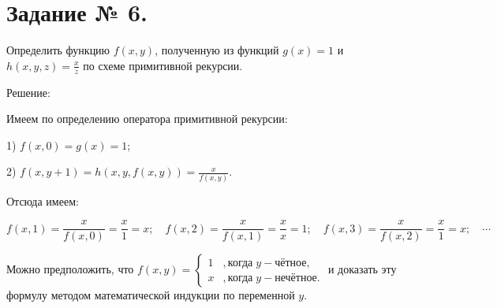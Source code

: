 \documentclass[fleqn]{article}
\begin{document}
\medskip
{}
\medskip

\section*{Задание № 6.}

Определить функцию $f(x,y)$, полученную из функций $g(x) =1$ и
$h(x, y, z) = \frac{x}{z}$ по схеме примитивной рекурсии.

\begin{center}Решение:\end{center}

Имеем по определению оператора примитивной рекурсии:

1) $f(x,0)=g(x)=1$;

2) $f(x,y+1)=h\left(x,y,f(x,y)\right)=\frac{x}{f(x,y)}$.

Отсюда имеем:

$$f(x,1)=\frac{x}{f(x,0)}=\frac{x}{1}=x;\quad f(x,2)=\frac{x}{f(x,1)}=\frac{x}{x}=1;\quad f(x,3)=\frac{x}{f(x,2)}=\frac{x}{1}=x;\quad\cdots$$

Можно предположить, что $f(x,y)=
\begin{cases}
1 & , \textit{когда} \;y - \textit{чётное}, \\
x & , \textit{когда} \;y - \textit{нечётное}.
\end{cases}$ и доказать эту формулу
методом математической индукции по переменной $y$.
\end{document}
